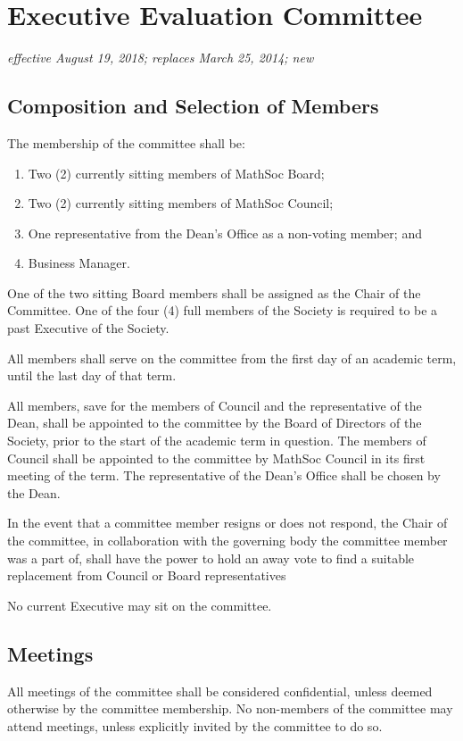 \section{Executive Evaluation Committee}
\emph{effective August 19, 2018; replaces March 25, 2014; new}\\

\subsection{Composition and Selection of Members}
The membership of the committee shall be:
\begin{enumerate}
    \item Two (2) currently sitting members of MathSoc Board;
    \item Two (2) currently sitting members of MathSoc Council;
    \item One representative from the Dean's Office as a non-voting member; and
    \item Business Manager.
\end{enumerate}

One of the two sitting Board members shall be assigned as the Chair of the Committee.
One of the four (4) full members of the Society is required to be a past Executive of the Society.
 
All members shall serve on the committee from the first day of an academic
term, until the last day of that term.

All members, save for the members of Council and the representative of the
Dean, shall be appointed to the committee by the Board of Directors of the
Society, prior to the start of the academic term in question. The members of
Council shall be appointed to the committee by MathSoc Council in its first
meeting of the term. The representative of the Dean's Office shall be chosen by
the Dean.

In the event that a committee member resigns or does not respond, the Chair of the committee, in collaboration with the governing body the committee member was a part of, shall have the power to hold an away vote to find a suitable replacement from Council or Board representatives

No current Executive may sit on the committee.

\subsection{Meetings}

All meetings of the committee shall be considered confidential, unless deemed
otherwise by the committee membership. No non-members of the committee may
attend meetings, unless explicitly invited by the committee to do so.

